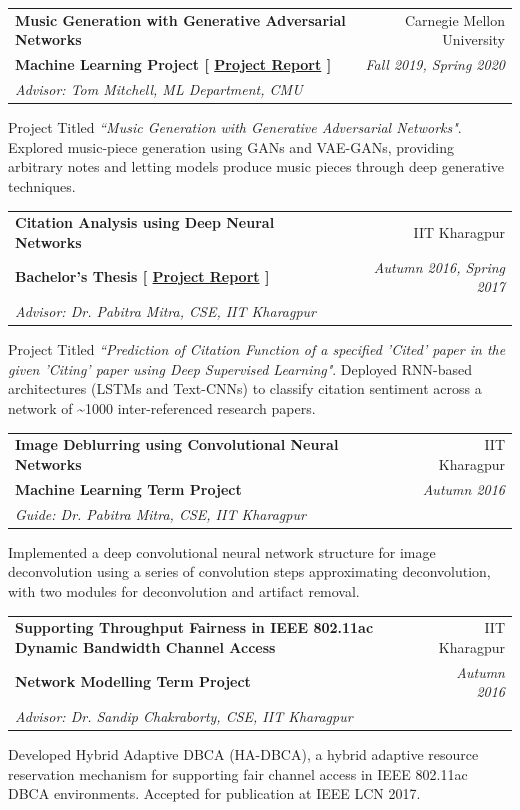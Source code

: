 \documentclass[letterpaper,11pt]{article}
\makeatletter
\newcommand{\resumeDoubleHeadingSubheading}[5]{
  \vspace{-1pt}\item
    \begin{tabular*}{0.97\textwidth}{l@{\extracolsep{\fill}}r}
      \textbf{#1} & #2 \\
      \textbf{#3} & \textit{\small #4} \\
      \textit{\small#5} \\
    \end{tabular*}\vspace{-5pt}
}
\newcommand{\resumeDoubleHeadingWrappedSubheading}[5]{
  \vspace{-1pt}\item
    \begin{tabular*}{0.97\textwidth}{l@{\extracolsep{\fill}}r}
      \textbf{#1} & #2 \\
      {\textbf{#3}} & \textit{\small #4} \\
      \textit{\small#5} \\
    \end{tabular*}\vspace{-5pt}
}
\newcommand{\resumeItemListStart}{\begin{itemize}}
\newcommand{\resumeItemListEnd}{\end{itemize}\vspace{-5pt}}
\makeatother
\begin{document}
  \resumeDoubleHeadingSubheading
    {Music Generation with Generative Adversarial Networks}{Carnegie Mellon University}
    {Machine Learning Project [
    \href{https://rawalvarun.github.io/files/project_reports/10_701_FINAL_PROJECT_REPORT_vrawal.pdf}{Project Report}
    ]}{Fall 2019, Spring 2020}
    {Advisor: Tom Mitchell, ML Department, CMU}
    \resumeItemListStart
    \vspace{5pt}
        {Project Titled \textit{``Music Generation with Generative Adversarial Networks"}. Explored music-piece generation using GANs and VAE-GANs, providing arbitrary notes and letting models produce music pieces through deep generative techniques.}
    \resumeItemListEnd

  \resumeDoubleHeadingSubheading
    {Citation Analysis using Deep Neural Networks}{IIT Kharagpur}
    {Bachelor's Thesis [
    \href{https://rawalvarun.github.io/files/project_reports/vrawal_iitkgp_BTP_Project_Report_FINAL.pdf}{Project Report}
    ]}{Autumn 2016, Spring 2017}
    {Advisor: Dr. Pabitra Mitra, CSE, IIT Kharagpur}
    \resumeItemListStart
    \vspace{5pt}
        {Project Titled \textit{``Prediction of Citation Function of a specified 'Cited' paper in the given 'Citing' paper using Deep Supervised Learning"}. Deployed RNN-based architectures (LSTMs and Text-CNNs) to classify citation sentiment across a network of \textasciitilde1000 inter-referenced research papers.}
    \resumeItemListEnd

  \resumeDoubleHeadingSubheading
    {Image Deblurring using Convolutional Neural Networks}{IIT Kharagpur}
    {Machine Learning Term Project}{Autumn 2016}
    {Guide: Dr. Pabitra Mitra, CSE, IIT Kharagpur}
    \resumeItemListStart
    \vspace{5pt}
        {Implemented a deep convolutional neural network structure for image deconvolution using a series of convolution steps approximating deconvolution, with two modules for deconvolution and artifact removal.}
    \resumeItemListEnd

  \resumeDoubleHeadingWrappedSubheading
    {\small{Supporting Throughput Fairness in IEEE 802.11ac Dynamic Bandwidth Channel Access}}{IIT Kharagpur}
    {Network Modelling Term Project}{Autumn 2016}
    {Advisor: Dr. Sandip Chakraborty, CSE, IIT Kharagpur}
    \resumeItemListStart
    \vspace{5pt}
        {Developed Hybrid Adaptive DBCA (HA-DBCA), a hybrid adaptive resource reservation mechanism for supporting fair channel access in IEEE 802.11ac DBCA environments. Accepted for publication at IEEE LCN 2017.}
    \resumeItemListEnd
\end{document}
